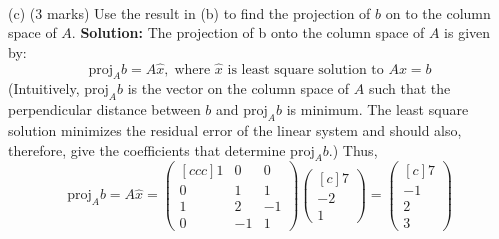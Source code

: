 \documentclass{article}
\begin{document}
\newline
\\ (c)  (3 marks) Use the result in (b) to find the projection of $b$ on to the column space of $A$.
\newline
\textbf{Solution:} 
The projection of b onto the column space of $A$ is given by:
$$\text{proj}_A b = A \hat{x}, \; \text{where } \hat{x} \text{ is least square solution to } A x = b$$
(Intuitively, $\text{proj}_A b$ is the vector on the column space of $A$ such that the perpendicular distance between $b$ and $\text{proj}_A b$ is minimum. The least square solution minimizes the residual error of the linear system and should also, therefore, give the coefficients that determine $\text{proj}_A b$.) Thus, 
$$\text{proj}_A b = A \hat{x} = 
\begin{pmatrix}[ccc]
    1 & 0 & 0 \\
    0 & 1 & 1\\
    1 & 2 & -1 \\
    0 & -1 & 1
\end{pmatrix} \begin{pmatrix}[c] 7 \\ -2 \\ 1   \end{pmatrix} = \begin{pmatrix}[c] 7 \\ -1 \\ 2 \\ 3   \end{pmatrix}$$ 

\newpage
\end{document}
